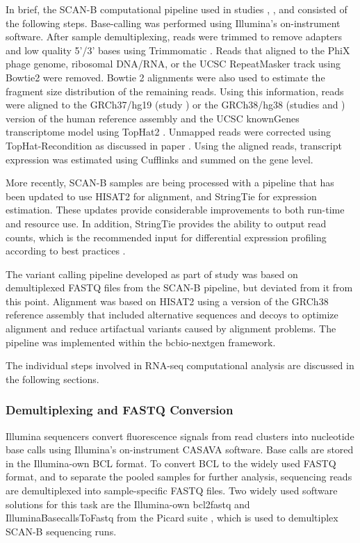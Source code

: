 \documentclass[11pt]{book}
\newcommand{\scanb}{\mbox{SCAN-B}}
\begin{document}
In brief, the SCAN-B computational pipeline used in studies \I, \III, and \IV consisted of the following steps. Base-calling was performed using Illumina's on-instrument software. After sample demultiplexing, reads were trimmed to remove adapters and low quality 5'/3' bases using Trimmomatic \cite{Bolger:2014}. Reads that aligned to the PhiX phage genome, ribosomal DNA/RNA, or the UCSC RepeatMasker track \cite{repeatmasker} using Bowtie2 \cite{LangmeadSalzberg:2012} were removed. Bowtie 2 alignments were also used to estimate the fragment size distribution of the remaining reads. Using this information, reads were aligned to the GRCh37/hg19 (study \I) or the GRCh38/hg38 (studies \III and \IV) version of the human reference assembly and the UCSC knownGenes transcriptome model using TopHat2 \cite{Kim:2013-tophat2}. Unmapped reads were corrected using TopHat-Recondition as discussed in paper \II. Using the aligned reads, transcript expression was estimated using Cufflinks \cite{Trapnell:2010, Roberts:2011} and summed on the gene level.

More recently, \scanb{} samples are being processed with a pipeline that has been updated to use HISAT2 \cite{Kim:2019-hisat2} for alignment, and StringTie \cite{Pertea:2015} for expression estimation. These updates provide considerable improvements to both run-time and resource use. In addition, StringTie provides the ability to output read counts, which is the recommended input for differential expression profiling according to best practices \cite{Conesa:2016}.

The variant calling pipeline developed as part of study \IV was based on demultiplexed FASTQ files from the \scanb{} pipeline, but deviated from it from this point. Alignment was based on HISAT2 using a version of the GRCh38 reference assembly that included alternative sequences and decoys to optimize alignment and reduce artifactual variants caused by alignment problems. The pipeline was implemented within the bcbio-nextgen \cite{bcbio-nextgen} framework.

The individual steps involved in RNA-seq computational analysis are discussed in the following sections.


\subsubsection*{Demultiplexing and FASTQ Conversion}

Illumina sequencers convert fluorescence signals from read clusters into nucleotide base calls using Illumina's on-instrument CASAVA software. Base calls are stored in the Illumina-own BCL format. To convert BCL to the widely used FASTQ format, and to separate the pooled samples for further analysis, sequencing reads are demultiplexed into sample-specific FASTQ files. Two widely used software solutions for this task are the Illumina-own bcl2fastq and IlluminaBasecallsToFastq from the Picard suite \cite{picard}, which is used to demultiplex \scanb{} sequencing runs.
\end{document}
